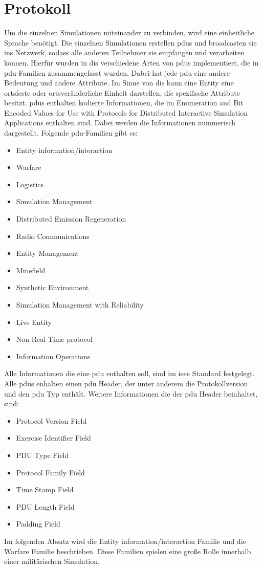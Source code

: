 \section{Protokoll}
Um die einzelnen Simulationen miteinander zu verbinden, wird eine einheitliche \glqq Sprache\grqq{} benötigt. Die einzelnen Simulationen erstellen \acp{pdu} und broadcasten sie ins Netzwerk, sodass alle anderen Teilnehmer sie empfangen und verarbeiten können. Hierfür wurden in \ac{dis} verschiedene Arten von \acp{pdu} implementiert, die in \ac{pdu}-Familien zusammengefasst wurden. Dabei hat jede \ac{pdu} eine andere Bedeutung und andere Attribute. Im Sinne von \ac{dis} kann eine Entity eine ortsfeste oder ortsveränderliche Einheit darstellen, die spezifische Attribute besitzt. \acp{pdu} enthalten kodierte Informationen, die im \glqq   Enumeration and Bit Encoded Values for Use with Protocols for Distributed Interactive Simulation Applications  \grqq{} enthalten sind. Dabei werden die Informationen nummerisch dargestellt. 
Folgende \ac{pdu}-Familien gibt es:
\begin{itemize}
	\singlespacing
	\item Entity information/interaction
	\item Warfare
	\item Logistics
	\item Simulation Management
	\item Distributed Emission Regeneration
	\item Radio Communications
	\item Entity Management
	\item Minefield
	\item Synthetic Environment
	\item Simulation Management with Reliability
	\item Live Entity
	\item Non-Real Time protocol
	\item Information Operations
	\singlespacing
\end{itemize}

Alle Informationen die eine \ac{pdu} enthalten soll, sind im \ac{ieee} Standard festgelegt. 
Alle \acp{pdu} enhalten einen \ac{pdu} Header, der unter anderem die Protokollversion und den \ac{pdu} Typ enthält.
 Weitere Informationen die der \ac{pdu} Header beinhaltet, sind: 

\begin{itemize}
	\singlespacing
	\item Protocol Version Field					
	 \item Exercise Identifier Field				
     \item 	PDU Type Field					
	\item	Protocol Family Field					
	 \item Time Stamp Field					
	\item PDU Length Field					
	\item Padding Field
\end{itemize}
\onehalfspacing
Im folgenden Absatz wird die Entity information/interaction Familie und die Warfare Familie beschrieben. Diese Familien spielen eine große Rolle innerhalb einer militärischen Simulation.
\\

